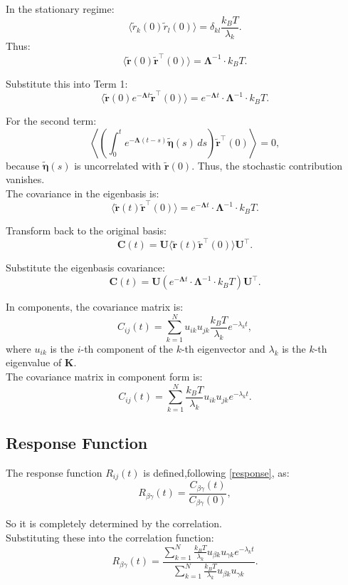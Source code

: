 \documentclass[English, Lau, oneside]{sapthesis}
\begin{document}
In the stationary regime:
\[
\langle \tilde{r}_k(0) \tilde{r}_l(0) \rangle = \delta_{kl} \frac{k_B T}{\lambda_k}.
\]
Thus:
\[
\langle \tilde{\mathbf{r}}(0) \tilde{\mathbf{r}}^\top(0) \rangle = \boldsymbol{\Lambda}^{-1} \cdot k_B T.
\]

Substitute this into Term 1:
\[
\langle \tilde{\mathbf{r}}(0) e^{-\boldsymbol{\Lambda} t} \tilde{\mathbf{r}}^\top(0) \rangle = e^{-\boldsymbol{\Lambda} t} \cdot \boldsymbol{\Lambda}^{-1} \cdot k_B T.
\]

For the second term:
\[
\left\langle \left( \int_0^t e^{-\boldsymbol{\Lambda} (t-s)} \tilde{\boldsymbol{\eta}}(s) \, ds \right) \tilde{\mathbf{r}}^\top(0) \right\rangle = 0,
\]
because \(\tilde{\boldsymbol{\eta}}(s)\) is uncorrelated with \(\tilde{\mathbf{r}}(0)\).
Thus, the stochastic contribution vanishes.\\
The covariance in the eigenbasis is:
\[
\langle \tilde{\mathbf{r}}(t) \tilde{\mathbf{r}}^\top(0) \rangle = e^{-\boldsymbol{\Lambda} t} \cdot \boldsymbol{\Lambda}^{-1} \cdot k_B T.
\]

Transform back to the original basis:
\[
\mathbf{C}(t) = \mathbf{U} \langle \tilde{\mathbf{r}}(t) \tilde{\mathbf{r}}^\top(0) \rangle \mathbf{U}^\top.
\]

Substitute the eigenbasis covariance:
\[
\mathbf{C}(t) = \mathbf{U} \left( e^{-\boldsymbol{\Lambda} t} \cdot \boldsymbol{\Lambda}^{-1} \cdot k_B T \right) \mathbf{U}^\top.
\]


In components, the covariance matrix is:
\[
C_{ij}(t) = \sum_{k=1}^N u_{ik} u_{jk} \frac{k_B T}{\lambda_k} e^{-\lambda_k t},
\]
where \(u_{ik}\) is the \(i\)-th component of the \(k\)-th eigenvector and \(\lambda_k\) is the \(k\)-th eigenvalue of \(\mathbf{K}\).\\
The covariance matrix in component form is:
\[
C_{ij}(t) = \sum_{k=1}^N \frac{k_B T}{\lambda_k} u_{ik} u_{jk} e^{-\lambda_k t}.
\]



\subsection {Response Function}
The response function \(R_{ij}(t)\) is defined,following \eqref{response}, as:\cite{ref13}
\begin{equation}
    R_{\beta\gamma}(t) = \frac{C_{\beta\gamma}(t)}{C_{\beta\gamma}(0)},
\end{equation}
    
So it is completely determined by the correlation.\\
Substituting these into the correlation function:
\[
R_{\beta\gamma}(t) = \frac{\sum_{k=1}^N \frac{k_B T}{\lambda_k} u_{\beta k} u_{\gamma k} e^{-\lambda_k t}}{\sum_{k=1}^N \frac{k_B T}{\lambda_k} u_{\beta k} u_{\gamma k}}.
\]
\end{document}
